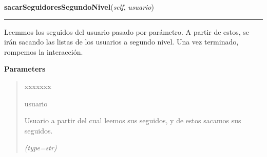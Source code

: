     \label{grafico:Grafico:sacarSeguidoresSegundoNivel}

    \vspace{0.5ex}

\hspace{.8\funcindent}\begin{boxedminipage}{\funcwidth}

    \raggedright \textbf{sacarSeguidoresSegundoNivel}(\textit{self}, \textit{usuario})

    \vspace{-1.5ex}

    \rule{\textwidth}{0.5\fboxrule}
\setlength{\parskip}{2ex}
    Leemmos los seguidos del usuario pasado por parámetro. A partir de 
    estos, se irán sacando las listas de los usuarios a segundo nivel. Una 
    vez terminado, rompemos la interacción.

\setlength{\parskip}{1ex}
      \textbf{Parameters}
      \vspace{-1ex}

      \begin{quote}
        \begin{Ventry}{xxxxxxx}

          \item[usuario]

          Usuario a partir del cual leemos sus seguidos, y de estos sacamos
          sus seguidos.

            {\it (type=str)}

        \end{Ventry}

      \end{quote}

    \end{boxedminipage}

    \label{grafico:Grafico:leerDocumentoAlgunasCategorias}

    \vspace{0.5ex}

